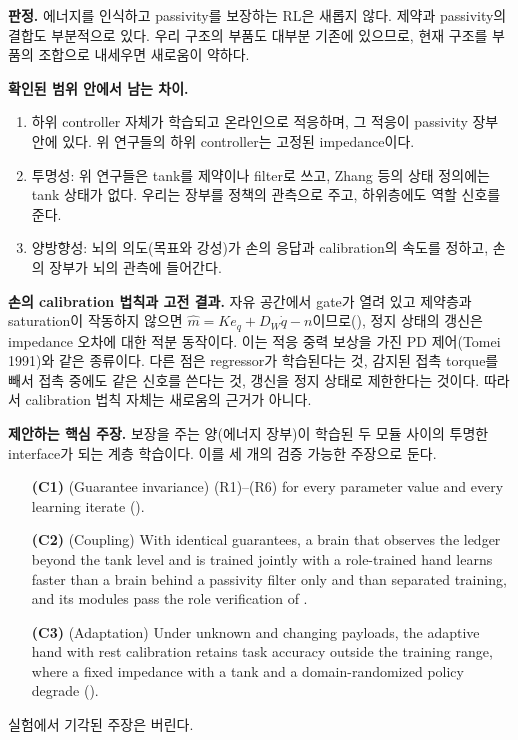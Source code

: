 \documentclass[11pt]{article}\usepackage[margin=1in]{geometry}\usepackage{amsmath,amssymb,amsthm,mathtools}\usepackage{graphicx}\graphicspath{{figures/}{../figures/}{figs/}{./}}\usepackage{enumitem}\usepackage{hyperref}\usepackage{cleveref}\usepackage{tikz}\usetikzlibrary{arrows.meta,positioning,calc,shapes.geometric}\usepackage{float}\usepackage{rotating}\usepackage[most]{tcolorbox}\usepackage{kotex}\usepackage{booktabs}\usepackage{longtable}\emergencystretch=1.6em\tolerance=2000 \crefname{assumption}{Assumption}{Assumptions}\Crefname{assumption}{Assumption}{Assumptions}\crefname{definition}{Definition}{Definitions}\Crefname{definition}{Definition}{Definitions}\crefname{proposition}{Proposition}{Propositions}\Crefname{proposition}{Proposition}{Propositions}\crefname{fact}{Fact}{Facts}\Crefname{fact}{Fact}{Facts} \newtheorem{assumption}{Assumption}\newtheorem{definition}{Definition}\newtheorem{lemma}{Lemma}\newtheorem{proposition}{Proposition}\newtheorem{theorem}{Theorem}\newtheorem{corollary}{Corollary}\newtheorem{fact}{Fact}\theoremstyle{remark}\newtheorem{remark}{Remark} \newcommand{\R}{\mathbb{R}}\newcommand{\xb}{\bar x}\newcommand{\Ab}{\bar A}\newcommand{\By}{\bar B_y}\newcommand{\U}{\mathcal U}\newcommand{\Z}{\mathcal Z}
\begin{document}
\textbf{판정.} 에너지를 인식하고 passivity를 보장하는 RL은 새롭지 않다. 제약과 passivity의 결합도 부분적으로 있다. 우리 구조의 부품도 대부분 기존에 있으므로, 현재 구조를 부품의 조합으로 내세우면 새로움이 약하다.

\textbf{확인된 범위 안에서 남는 차이.}
\begin{enumerate}[label=(\alph*)]
\item 하위 controller 자체가 학습되고 온라인으로 적응하며, 그 적응이 passivity 장부 안에 있다. 위 연구들의 하위 controller는 고정된 impedance이다.
\item 투명성: 위 연구들은 tank를 제약이나 filter로 쓰고, Zhang 등의 상태 정의에는 tank 상태가 없다. 우리는 장부를 정책의 관측으로 주고, 하위층에도 역할 신호를 준다.
\item 양방향성: 뇌의 의도(목표와 강성)가 손의 응답과 calibration의 속도를 정하고, 손의 장부가 뇌의 관측에 들어간다.
\end{enumerate}

\textbf{손의 calibration 법칙과 고전 결과.} 자유 공간에서 gate가 열려 있고 제약층과 saturation이 작동하지 않으면 $\hat m=Ke_q+D_W\dot q-n$이므로(), 정지 상태의 갱신은 impedance 오차에 대한 적분 동작이다. 이는 적응 중력 보상을 가진 PD 제어(Tomei 1991)와 같은 종류이다. 다른 점은 regressor가 학습된다는 것, 감지된 접촉 torque를 빼서 접촉 중에도 같은 신호를 쓴다는 것, 갱신을 정지 상태로 제한한다는 것이다. 따라서 calibration 법칙 자체는 새로움의 근거가 아니다.

\textbf{제안하는 핵심 주장.} 보장을 주는 양(에너지 장부)이 학습된 두 모듈 사이의 투명한 interface가 되는 계층 학습이다. 이를 세 개의 검증 가능한 주장으로 둔다.
\begin{itemize}
\item[\textbf{(C1)}] (Guarantee invariance) (R1)--(R6) for every parameter value and every learning iterate ().
\item[\textbf{(C2)}] (Coupling) With identical guarantees, a brain that observes the ledger beyond the tank level and is trained jointly with a role-trained hand learns faster than a brain behind a passivity filter only and than separated training, and its modules pass the role verification of .
\item[\textbf{(C3)}] (Adaptation) Under unknown and changing payloads, the adaptive hand with rest calibration retains task accuracy outside the training range, where a fixed impedance with a tank and a domain-randomized policy degrade ().
\end{itemize}
실험에서 기각된 주장은 버린다.
\end{document}
